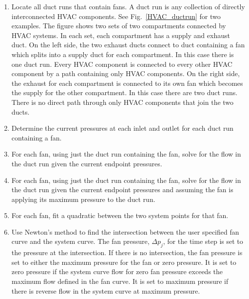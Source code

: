 \begin{enumerate}
   \item Locate all duct runs that contain fans. A duct run is any collection of directly interconnected HVAC components. See Fig.~\ref{HVAC_ductrun} for two examples. The figure shows two sets of two compartments connected by HVAC systems. In each set, each compartment has a supply and exhaust duct. On the left side, the two exhaust ducts connect to duct containing a fan which splits into a supply duct for each compartment. In this case there is one duct run. Every HVAC component is connected to every other HVAC component by a path containing only HVAC components. On the right side, the exhaust for each compartment is connected to its own fan which becomes the supply for the other compartment. In this case there are two duct runs. There is no direct path through only HVAC components that join the two ducts.
   \item Determine the current pressures at each inlet and outlet for each duct run containing a fan.
   \item For each fan, using just the duct run containing the fan, solve for the flow in the duct run given the current endpoint pressures.
   \item For each fan, using just the duct run containing the fan, solve for the flow in the duct run given the current endpoint pressures and assuming the fan is applying its maximum pressure to the duct run.
   \item For each fan, fit a quadratic between the two system points for that fan.
   \item Use Newton's method to find the intersection between the user specified fan curve and the system curve. The fan pressure, $\Delta p_j$, for the time step is set to the pressure at the intersection. If there is no intersection, the fan pressure is set to either the maximum pressure for the fan or zero pressure. It is set to zero pressure if the system curve flow for zero fan pressure exceeds the maximum flow defined in the fan curve. It is set to maximum pressure if there is reverse flow in the system curve at maximum pressure.
\end{enumerate}

